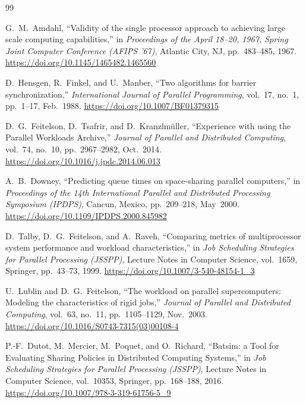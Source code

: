 \documentclass[11pt,a4paper]{article}
\begin{document}
\begin{thebibliography}{99}

G.~M.~Amdahl,
``Validity of the single processor approach to achieving large scale computing capabilities,''
in \textit{Proceedings of the April 18--20, 1967, Spring Joint Computer Conference (AFIPS '67)}, Atlantic City, NJ, pp.~483--485, 1967.
\url{https://doi.org/10.1145/1465482.1465560}

D.~Hensgen, R.~Finkel, and U.~Manber,
``Two algorithms for barrier synchronization,''
\textit{International Journal of Parallel Programming}, vol.~17, no.~1, pp.~1--17, Feb.~1988.
\url{https://doi.org/10.1007/BF01379315}

D.~G.~Feitelson, D.~Tsafrir, and D.~Kranzlm{\"u}ller,
``Experience with using the Parallel Workloads Archive,''
\textit{Journal of Parallel and Distributed Computing}, vol.~74, no.~10, pp.~2967--2982, Oct.~2014.
\url{https://doi.org/10.1016/j.jpdc.2014.06.013}

A.~B.~Downey,
``Predicting queue times on space-sharing parallel computers,''
in \textit{Proceedings of the 14th International Parallel and Distributed Processing Symposium (IPDPS)}, Cancun, Mexico, pp.~209--218, May~2000.
\url{https://doi.org/10.1109/IPDPS.2000.845982}

D.~Talby, D.~G.~Feitelson, and A.~Raveh,
``Comparing metrics of multiprocessor system performance and workload characteristics,''
in \textit{Job Scheduling Strategies for Parallel Processing (JSSPP)}, Lecture Notes in Computer Science, vol.~1659, Springer, pp.~43--73, 1999.
\url{https://doi.org/10.1007/3-540-48154-1_3}

U.~Lublin and D.~G.~Feitelson,
``The workload on parallel supercomputers: Modeling the characteristics of rigid jobs,''
\textit{Journal of Parallel and Distributed Computing}, vol.~63, no.~11, pp.~1105--1129, Nov.~2003.
\url{https://doi.org/10.1016/S0743-7315(03)00108-4}

P.-F.~Dutot, M.~Mercier, M.~Poquet, and O.~Richard,
``Batsim: a Tool for Evaluating Sharing Policies in Distributed Computing Systems,''
in \textit{Job Scheduling Strategies for Parallel Processing (JSSPP)}, Lecture Notes in Computer Science, vol.~10353, Springer, pp.~168--188, 2016.
\url{https://doi.org/10.1007/978-3-319-61756-5_9}


\end{thebibliography}
\end{document}
